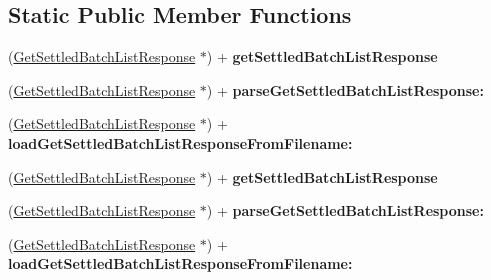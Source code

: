 \subsection*{Static Public Member Functions}
\begin{DoxyCompactItemize}
\item 
\hypertarget{interface_get_settled_batch_list_response_a9d003bb648dcac34305e9270be4b0bc2}{
(\hyperlink{interface_get_settled_batch_list_response}{GetSettledBatchListResponse} $\ast$) + {\bfseries getSettledBatchListResponse}}
\label{interface_get_settled_batch_list_response_a9d003bb648dcac34305e9270be4b0bc2}

\item 
\hypertarget{interface_get_settled_batch_list_response_ab82d190eab8c684af8855277f747ee9b}{
(\hyperlink{interface_get_settled_batch_list_response}{GetSettledBatchListResponse} $\ast$) + {\bfseries parseGetSettledBatchListResponse:}}
\label{interface_get_settled_batch_list_response_ab82d190eab8c684af8855277f747ee9b}

\item 
\hypertarget{interface_get_settled_batch_list_response_a48381e3e6e9fdbd6da3bcee71d7a40ad}{
(\hyperlink{interface_get_settled_batch_list_response}{GetSettledBatchListResponse} $\ast$) + {\bfseries loadGetSettledBatchListResponseFromFilename:}}
\label{interface_get_settled_batch_list_response_a48381e3e6e9fdbd6da3bcee71d7a40ad}

\item 
\hypertarget{interface_get_settled_batch_list_response_a9d003bb648dcac34305e9270be4b0bc2}{
(\hyperlink{interface_get_settled_batch_list_response}{GetSettledBatchListResponse} $\ast$) + {\bfseries getSettledBatchListResponse}}
\label{interface_get_settled_batch_list_response_a9d003bb648dcac34305e9270be4b0bc2}

\item 
\hypertarget{interface_get_settled_batch_list_response_ab82d190eab8c684af8855277f747ee9b}{
(\hyperlink{interface_get_settled_batch_list_response}{GetSettledBatchListResponse} $\ast$) + {\bfseries parseGetSettledBatchListResponse:}}
\label{interface_get_settled_batch_list_response_ab82d190eab8c684af8855277f747ee9b}

\item 
\hypertarget{interface_get_settled_batch_list_response_a48381e3e6e9fdbd6da3bcee71d7a40ad}{
(\hyperlink{interface_get_settled_batch_list_response}{GetSettledBatchListResponse} $\ast$) + {\bfseries loadGetSettledBatchListResponseFromFilename:}}
\label{interface_get_settled_batch_list_response_a48381e3e6e9fdbd6da3bcee71d7a40ad}


\end{DoxyCompactItemize}
